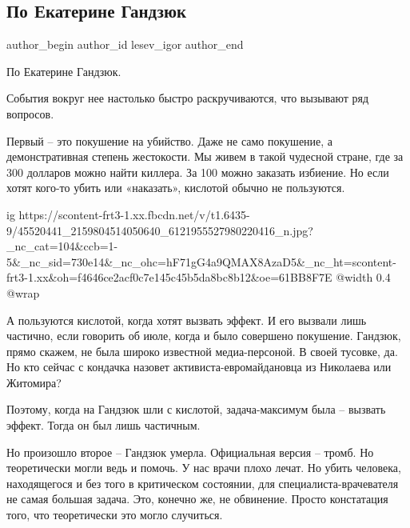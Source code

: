  
 
 
 
 
 
\subsection{По Екатерине Гандзюк}
\label{sec:05_11_2018.fb.lesev_igor.1.ekaterina_gandzjuk}
 
\ifcmt
 author_begin
   author_id lesev_igor
 author_end
\fi

По Екатерине Гандзюк.

События вокруг нее настолько быстро раскручиваются, что вызывают ряд вопросов.

Первый – это покушение на убийство. Даже не само покушение, а демонстративная
степень жестокости. Мы живем в такой чудесной стране, где за 300 долларов можно
найти киллера. За 100 можно заказать избиение. Но если хотят кого-то убить или
«наказать», кислотой обычно не пользуются.

\ifcmt
  ig https://scontent-frt3-1.xx.fbcdn.net/v/t1.6435-9/45520441_2159804514050640_6121955527980220416_n.jpg?_nc_cat=104&ccb=1-5&_nc_sid=730e14&_nc_ohc=hF71gG4a9QMAX8AzaD5&_nc_ht=scontent-frt3-1.xx&oh=f4646ce2acf0c7e145c45b5da8bc8b12&oe=61BB8F7E
  @width 0.4
  @wrap 
\fi

А пользуются кислотой, когда хотят вызвать эффект. И его вызвали лишь частично,
если говорить об июле, когда и было совершено покушение. Гандзюк, прямо скажем,
не была широко известной медиа-персоной. В своей тусовке, да. Но кто сейчас с
кондачка назовет активиста-евромайдановца из Николаева или Житомира?

Поэтому, когда на Гандзюк шли с кислотой, задача-максимум была – вызвать
эффект. Тогда он был лишь частичным.

Но произошло второе – Гандзюк умерла. Официальная версия – тромб. Но
теоретически могли ведь и помочь. У нас врачи плохо лечат. Но убить человека,
находящегося и без того в критическом состоянии, для специалиста-врачевателя не
самая большая задача. Это, конечно же, не обвинение. Просто констатация того,
что теоретически это могло случиться.

